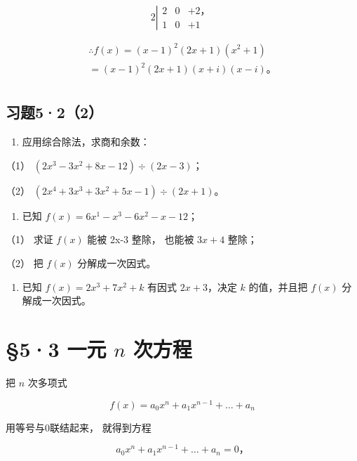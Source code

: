 \[
2 \left| \begin{array}{ccc} 2 & 0 & + 2\text{，} \\ 1 & 0 & + 1 \end{array} \right.
\]

\[
\begin{array}{l} \therefore f (x) = (x - 1) ^ {2} (2 x + 1) (x ^ {2} + 1) \\ = (x - 1) ^ {2} (2 x + 1) (x + i) (x - i)\text{。} \\ \end{array}
\]

\subsection{习题5·2（2）}

\begin{enumerate}
\item
  应用综合除法，求商和余数：
\end{enumerate}

（1） \((2x^{3} - 3x^{2} + 8x - 12) \div (2x - 3)\)；

（2） \((2x^{4} + 3x^{3} + 3x^{2} + 5x - 1) \div (2x + 1)\)。

\begin{enumerate}[start=2]
\item
  已知 \(f(x) = 6x^{1} - x^{3} - 6x^{2} - x - 12\)；
\end{enumerate}

（1） 求证 \(f(x)\) 能被 2x-3 整除， 也能被 \(3x+4\) 整除；

（2） 把 \(f(x)\) 分解成一次因式。

\begin{enumerate}[start=3]
\item
  已知 \(f(x) = 2x^3 + 7x^2 + k\) 有因式 \(2x + 3\)，决定 \(k\)
  的值，并且把 \(f(x)\) 分解成一次因式。
\end{enumerate}

\section{\texorpdfstring{§5·3 一元 \(n\) 次方程}{§5·3 一元 n 次方程}}

把 \(n\) 次多项式

\[
f (x) = a _ {0} x ^ {n} + a _ {1} x ^ {n - 1} + \dots + a _ {n}
\]

用等号与0联结起来， 就得到方程

\[
a _ {0} x ^ {n} + a _ {1} x ^ {n - 1} + \dots + a _ {n} = 0\text{，} \tag {1}
\]

